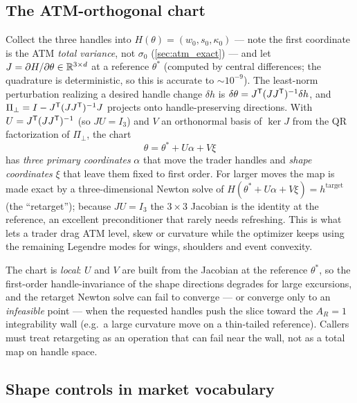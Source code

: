 \documentclass[11pt]{article}
\begin{document}
\subsection{The ATM-orthogonal chart}
\label{sec:ortho}

Collect the three handles into $H(\theta)=(w_0,s_0,\kappa_0)$ --- note the
first coordinate is the ATM \emph{total variance}, not $\sigma_0$
(\cref{sec:atm_exact}) --- and let
$J=\partial H/\partial\theta\in\mathbb{R}^{3\times d}$ at a reference $\theta^*$ (computed
by central differences; the quadrature is deterministic, so this is accurate to
$\sim10^{-9}$). The least-norm perturbation realizing a desired handle change
$\delta h$ is $\delta\theta=J^{\mathsf{T}}(JJ^{\mathsf{T}})^{-1}\delta h$, and
$\Pi_\perp=I-J^{\mathsf{T}}(JJ^{\mathsf{T}})^{-1}J$ projects onto handle-preserving directions. With
$U=J^{\mathsf{T}}(JJ^{\mathsf{T}})^{-1}$ (so $JU=I_3$) and $V$ an orthonormal basis of $\ker J$ from the
QR factorization of $\Pi_\perp$, the chart
\begin{equation}
\theta=\theta^*+U\alpha+V\xi
\end{equation}
has \emph{three primary coordinates} $\alpha$ that move the trader handles and
\emph{shape coordinates} $\xi$ that leave them fixed to first order. For larger
moves the map is made exact by a three-dimensional Newton solve of
$H(\theta^*+U\alpha+V\xi)=h^{\text{target}}$ (the ``retarget''); because $JU=I_3$
the $3\times3$ Jacobian is the identity at the reference, an excellent
preconditioner that rarely needs refreshing. This is what lets a trader drag ATM
level, skew or curvature while the optimizer keeps using the remaining Legendre
modes for wings, shoulders and event convexity.

\begin{caution}
The chart is \emph{local}: $U$ and $V$ are built from the Jacobian at the
reference $\theta^*$, so the first-order handle-invariance of the shape
directions degrades for large excursions, and the retarget Newton solve can
fail to converge --- or converge only to an \emph{infeasible} point --- when
the requested handles push the slice toward the $A_R=1$ integrability wall
(e.g.\ a large curvature move on a thin-tailed reference). Callers must treat
retargeting as an operation that can fail near the wall, not as a total map on
handle space.
\end{caution}

\subsection{Shape controls in market vocabulary}
\label{sec:packages}
\end{document}
